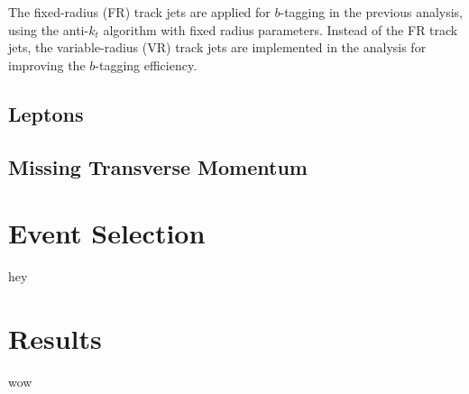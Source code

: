 \documentclass[class=NTHU_thesis, crop=false]{standalone}
\begin{document}
The fixed-radius (FR) track jets are applied for $b$-tagging in the previous analysis, using the anti-$k_t$ algorithm with fixed radius parameters. Instead of the FR track jets, the variable-radius (VR) track jets are implemented in the analysis for improving the $b$-tagging efficiency.

\subsection{Leptons}

\subsection{Missing Transverse Momentum}


\section{Event Selection}
hey

\section{Results}
wow
\end{document}
